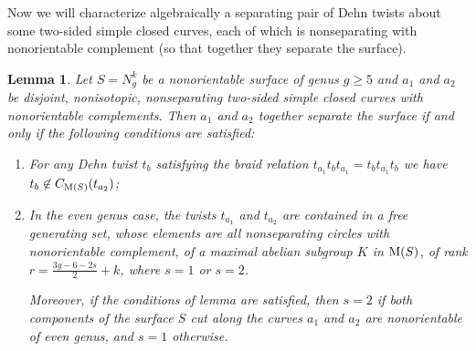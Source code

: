 \documentclass[11 pt]{amsart}
\newtheorem{Lemma}[Theorem]{Lemma}
\theoremstyle{definition}
\begin{document}
Now we will characterize algebraically a separating pair of Dehn
twists about some two-sided simple closed curves, each of which is
nonseparating with nonorientable complement (so that together they
separate the surface).

\begin{Lemma}\label{Separating Pair Characterization}
Let $S=N_g^k$ be a nonorientable surface of genus $g\geq 5$ and
$a_1$ and $a_2$ be disjoint, nonisotopic, nonseparating two-sided
simple closed curves with nonorientable complements. Then $a_1$ and
$a_2$ together separate the surface if and only if the following
conditions are satisfied:
\begin{enumerate}
\item For any Dehn twist $t_b$ satisfying the braid relation
$t_{a_1}t_bt_{a_1}=t_bt_{a_1}t_b$ we have $t_b\not\in C_{{\rm
M}(S)}(t_{a_2})$;
\item In the even genus case, the twists $t_{a_1}$ and $t_{a_2}$ are
contained in a free generating set, whose elements are all
nonseparating circles with nonorientable complement, of a maximal
abelian subgroup $K$ in ${\rm M}(S)$, of rank
$r=\frac{3g-6-2s}{2}+k$, where $s=1$ or $s=2$.

Moreover, if the conditions of lemma are satisfied, then $s=2$ if
both components of the surface $S$ cut along the curves $a_1$ and
$a_2$ are nonorientable of even genus, and $s=1$ otherwise.
\end{enumerate}
\end{Lemma}
\end{document}
